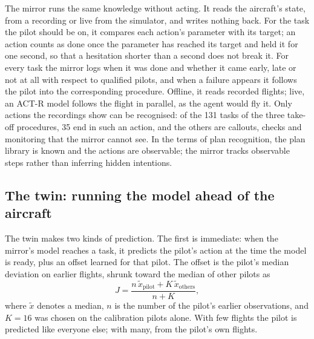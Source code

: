 \documentclass{llncs}
\begin{document}
The mirror runs the same knowledge without acting. It reads the aircraft's state, from a recording or live from the simulator, and
writes nothing back. For the task the pilot should be on, it compares each action's parameter with its target; an action counts as
done once the parameter has reached its target and held it for one second, so that a hesitation shorter than a second does not break it.
For every task the mirror logs when it was done and whether it came early, late or not at all with respect to qualified pilots, and when
a failure appears it follows the pilot into the corresponding procedure. Offline, it reads recorded flights; live, an ACT-R model follows
the flight in parallel, as the agent would fly it. Only actions the recordings show can be recognised: of the 131 tasks of the three
take-off procedures, 35 end in such an action, and the others are callouts, checks and monitoring that the mirror cannot see. In the terms
of plan recognition, the plan library is known and the actions are observable; the mirror tracks observable steps rather than inferring
hidden intentions.

\subsection{The twin: running the model ahead of the aircraft}

The twin makes two kinds of prediction. The first is immediate: when the mirror's model reaches a task, it predicts the pilot's action
at the time the model is ready, plus an offset learned for that pilot. The offset is the pilot's median deviation on earlier flights,
shrunk toward the median of other pilots as
\begin{equation}
J = \frac{n\,\tilde{x}_{\mathrm{pilot}} + K\,\tilde{x}_{\mathrm{others}}}{n + K},
\label{eq:shrink}
\end{equation}
where $\tilde{x}$ denotes a median, $n$ is the number of the pilot's earlier observations, and $K = 16$ was chosen on the calibration
pilots alone. With few flights the pilot is predicted like everyone else; with many, from the pilot's own flights.
\end{document}

